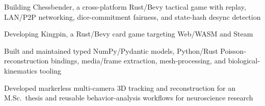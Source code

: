 {  \cvRoleBreak
  \begin{cvitems}
    \item Building Chessbender, a cross-platform Rust/Bevy tactical game with replay, LAN/P2P networking, dice-commitment fairness, and state-hash desync detection
    \item Developing Kingpin, a Rust/Bevy card game targeting Web/WASM and Steam
  \end{cvitems}

  \cvRoleBreak
  \begin{cvitems}
    \item Built and maintained typed NumPy/Pydantic models, Python/Rust Poisson-reconstruction bindings, media/frame extraction, mesh-processing, and biological-kinematics tooling
    \item Developed markerless multi-camera 3D tracking and reconstruction for an M.Sc.\ thesis and reusable behavior-analysis workflows for neuroscience research
  \end{cvitems}
}

